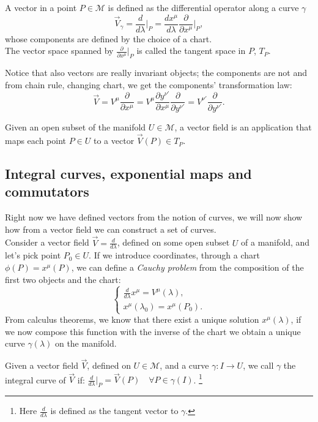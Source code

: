 \begin{defin}[Vectors]
	A vector in a point $P\in\mathcal{M}$ is defined as the differential operator along a curve $\gamma$ $$\boxed{\vec V_\gamma= \frac{d}{d\lambda}\bigg|_P=\frac{dx^\mu}{d\lambda}\frac{\partial}{\partial x^\mu}\bigg|_P},$$
    whose components are defined by the choice of a chart.\\
	The vector space spanned by $\frac{\partial}{\partial x^\mu}\big|_P$ is called the tangent space in $P$, $T_P$.
\end{defin}
Notice that also vectors are really invariant objects; the components are not and from chain rule, changing chart, we get the components' transformation law:
$$\vec V= V^\mu \frac{\partial}{\partial x^\mu}= V^\mu \frac{\partial y^{\nu'}}{\partial x^\mu}\frac{\partial}{\partial y^{\nu'}}=V^{\nu'}\frac{\partial}{\partial y^{\nu'}}.$$
\begin{defin}
	Given an open subset of the manifold $U\in\mathcal{M}$, a vector field is an application that maps each point $P\in U$ to a vector $\vec V(P)\in T_P$.
\end{defin}
\subsection{Integral curves, exponential maps and commutators}
Right now we have defined vectors from the notion of curves, we will now show how from a vector field we can construct a set of curves.\\ Consider a vector field $\vec V=\frac{d}{d\lambda}$, defined on some open subset $U$ of a manifold, and let's pick point $P_0\in U$. If we introduce coordinates, through a chart $\phi(P)=x^\mu(P)$, we can define a \emph{Cauchy problem} from the composition of the first two objects and the chart:
\begin{equation*}
	\begin{cases}
		\frac{d}{d\lambda}x^\mu=V^\mu(\lambda),\\x^\mu(\lambda_0)=x^\mu(P_0).
	\end{cases}
\end{equation*}
From calculus theorems, we know that there exist a unique solution $x^\mu(\lambda)$, if we now compose this function with the inverse of the chart we obtain a unique curve $\gamma(\lambda)$ on the manifold.
\begin{defin}
	Given a vector field $\vec V$, defined on $U\in\mathcal{M} $, and a curve $\gamma:I \rightarrow U$, we call $\gamma$ the integral curve of  $\vec{V}$ if: $\frac{d}{d\lambda}\big|_{P}=\vec{V}(P)\quad \forall P\in \gamma(I)$. \footnote{Here $\frac{d}{d\lambda}$ is defined as the tangent vector to $\gamma$.}
\end{defin}

